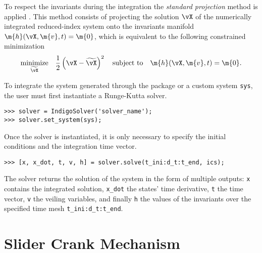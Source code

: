 To respect the invariants during the integration the \emph{standard projection} method is applied \cite{hairer2000symmetric}. This method consists of projecting the solution $\vX$ of the numerically integrated reduced-index system onto the invariants manifold $\m{h}(\vX, \m{v}, t) = \m{0}$, which is equivalent to the following constrained minimization
%
\begin{equation}
  \underset{\widetilde{\vX}}{\textrm{minimize}} \quad \dfrac{1}{2}\left(\vX - \widetilde{\vX}\right)^2
    \quad \textrm{subject to} \quad
    \m{h}(\vX, \m{v}, t) = \m{0}.
\end{equation}

To integrate the system generated through the \Matlab{} package or a custom system \texttt{sys}, the user must first instantiate a \Indigo{} Runge-Kutta solver.
%
\begin{verbatim}
>>> solver = IndigoSolver('solver_name');
>>> solver.set_system(sys);
\end{verbatim}
%
Once the solver is instantiated, it is only necessary to specify the initial conditions and the integration time vector.
%
\begin{verbatim}
>>> [x, x_dot, t, v, h] = solver.solve(t_ini:d_t:t_end, ics);
\end{verbatim}
%
The solver returns the solution of the system in the form of multiple outputs: \texttt{x} contains the integrated solution, \texttt{x\_dot} the states' time derivative, \texttt{t} the time vector, \texttt{v} the veiling variables, and finally \texttt{h} the values of the invariants over the specified time mesh \texttt{t\_ini:d\_t:t\_end}.


\section{Slider Crank Mechanism}
\label{chap6:sec:experiment}

